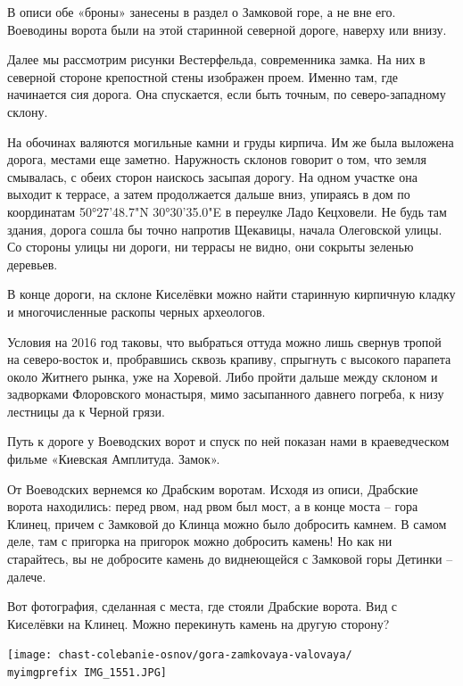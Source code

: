 В описи обе «броны» занесены в раздел о Замковой горе, а не вне его. Воеводины ворота были на этой старинной северной дороге, наверху или внизу.

Далее мы рассмотрим рисунки Вестерфельда, современника замка. На них в северной стороне крепостной стены изображен проем. Именно там, где начинается сия дорога. Она спускается, если быть точным, по северо-западному склону. 

На обочинах валяются могильные камни и груды кирпича. Им же была выложена дорога, местами еще заметно. Наружность склонов говорит о том, что земля смывалась, с обеих сторон наискось засыпая дорогу. На одном участке она выходит к террасе, а затем продолжается дальше вниз, упираясь в дом по координатам 50°27'48.7"N 30°30'35.0"E в переулке Ладо Кецховели. Не будь там здания, дорога сошла бы точно напротив Щекавицы, начала Олеговской улицы. Со стороны улицы ни дороги, ни террасы не видно, они сокрыты зеленью деревьев.

В конце дороги, на склоне Киселёвки можно найти старинную кирпичную кладку и многочисленные раскопы черных археологов. 

Условия на 2016 год таковы, что выбраться оттуда можно лишь свернув тропой на северо-восток и, пробравшись сквозь крапиву, спрыгнуть с высокого парапета около Житнего рынка, уже на Хоревой. Либо пройти дальше между склоном и задворками Флоровского монастыря, мимо засыпанного давнего погреба, к низу лестницы да к Черной грязи.

Путь к дороге у Воеводских ворот и спуск по ней показан нами в краеведческом фильме «Киевская Амплитуда. Замок».


От Воеводских вернемся ко Драбским воротам. Исходя из описи, Драбские ворота находились: перед рвом, над рвом был мост, а в конце моста – гора Клинец, причем с Замковой до Клинца можно было добросить камнем. В самом деле, там с пригорка на пригорок можно добросить камень! Но как ни старайтесь, вы не добросите камень до виднеющейся с Замковой горы Детинки – далече. 

Вот фотография, сделанная с места, где стояли Драбские ворота. Вид с Киселёвки на Клинец. Можно перекинуть камень на другую сторону?

\begin{center}
\texttt{[image: chast-colebanie-osnov/gora-zamkovaya-valovaya/\\myimgprefix IMG\_1551.JPG]}
\end{center}

